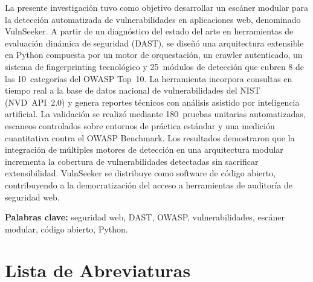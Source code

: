 \documentclass[12pt, a4paper]{article}
\begin{document}
La presente investigación tuvo como objetivo desarrollar un escáner modular para
la detección automatizada de vulnerabilidades en aplicaciones web, denominado
VulnSeeker. A partir de un diagnóstico del estado del arte en herramientas de
evaluación dinámica de seguridad (DAST), se diseñó una arquitectura extensible en
Python compuesta por un motor de orquestación, un crawler autenticado, un sistema
de fingerprinting tecnológico y 25~módulos de detección que cubren 8 de las
10~categorías del OWASP Top~10. La herramienta incorpora consultas en tiempo real
a la base de datos nacional de vulnerabilidades del NIST (NVD~API~2.0) y genera
reportes técnicos con análisis asistido por inteligencia artificial. La validación
se realizó mediante 180~pruebas unitarias automatizadas, escaneos controlados
sobre entornos de práctica estándar y una medición cuantitativa contra el OWASP
Benchmark. Los resultados demostraron que la integración
de múltiples motores de detección en una arquitectura modular incrementa la
cobertura de vulnerabilidades detectadas sin sacrificar extensibilidad. VulnSeeker
se distribuye como software de código abierto, contribuyendo a la democratización
del acceso a herramientas de auditoría de seguridad web.

\vspace{0.5cm}
\textbf{Palabras clave:} seguridad web, DAST, OWASP, vulnerabilidades, escáner
modular, código abierto, Python.

\newpage
\tableofcontents

\newpage
\listoftables

\newpage
\listoffigures

\newpage
\section*{Lista de Abreviaturas}
\end{document}
